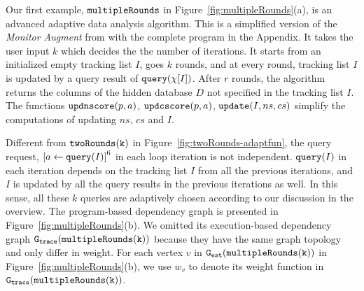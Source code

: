 \begin{example}
    \label{ex:multipleRounds}
    Our first example, $\mathtt{multipleRounds}$ in Figure~\ref{fig:multipleRounds}(a), is an advanced adaptive data analysis algorithm.
    This is a simplified version of the \emph{Monitor Augment} from \cite{RogersRSSTW20} with the complete program in the Appendix.
    It takes the user input $k$ which decides the 
    the number of iterations.
    It starts from an initialized empty tracking list $I$,
    goes $k$ rounds, and at every round, tracking list $I$ is updated by a query result of ${\tt query}(\chi[I])$.
    After $r$ rounds, the algorithm returns the columns of the hidden database $D$ not specified in the tracking list $I$.
    The functions $\mathtt{updnscore}(p,a)$,
    $\mathtt{updcscore}(p,a)$, $\mathtt{update}(I,ns,cs)$ simplify the computations of updating $ns$, $cs$ and $I$.%
    
     Different from $\mathtt{twoRounds(k)}$ in Figure~\ref{fig:twoRounds-adaptfun},
    the query request, $\clabel{\assign{a}{\query(I)}}^6$ in each loop iteration is not independent. 
    ${\tt query}(I)$ in each iteration depends on the tracking list $I$ from all the previous iterations, 
    and $I$ is updated by all the query results in the previous iterations as well. 
    In this sense, all these $k$ queries are adaptively chosen according to our discussion in the overview.
    The program-based dependency graph is presented in Figure~\ref{fig:multipleRounds}(b). 
    We omitted its execution-based dependency graph $\mathtt{{G_{trace}}}(\mathtt{multipleRounds(k)})$ because they have the same graph topology and only differ in weight.
    For each vertex $v$ in $\mathtt{{G_{est}}}(\mathtt{multipleRounds(k)})$ in Figure~\ref{fig:multipleRounds}(b),
    we use $w_{v}$ to denote its weight function in $\mathtt{{G_{trace}}}(\mathtt{multipleRounds(k)})$.
    

\end{example}
